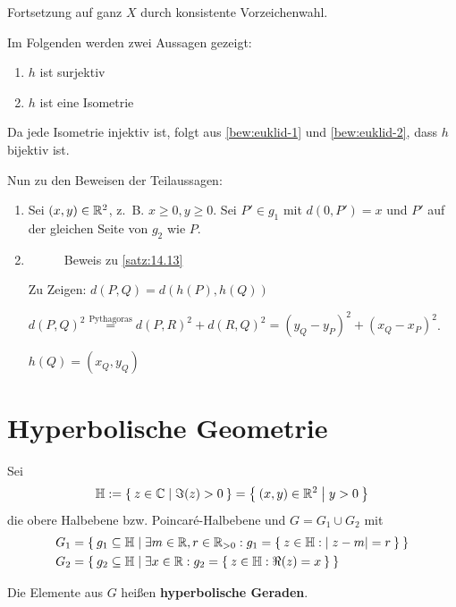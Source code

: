 \begin{beweis}
\begin{enumerate}[label=(\roman*)]
              Fortsetzung auf ganz $X$ durch konsistente Vorzeichenwahl.

			Im Folgenden werden zwei Aussagen gezeigt:
			\begin{enumerate}[label=(\roman*)]
				\item \label{bew:euklid-1} $h$ ist surjektiv
				\item \label{bew:euklid-2} $h$ ist eine Isometrie
			\end{enumerate}

			Da jede Isometrie injektiv ist, folgt aus \ref{bew:euklid-1}
			und \ref{bew:euklid-2}, dass $h$ bijektiv ist.

			Nun zu den Beweisen der Teilaussagen:

		 	\begin{enumerate}[label=(\roman*)]
				\item Sei $(x, y) \in \mathbb{R}^2$, z.~B. $x \geq 0, y \geq 0$.
                Sei $P' \in g_1$ mit $d(0, P') = x$ und
                $P'$ auf der gleichen Seite von $g_2$ wie $P$.
				\item \begin{figure}[htp]
                    \centering
                    
                    \caption{Beweis zu \cref{satz:14.13}}
                    \label{fig:14.13.0.1}
                \end{figure}
                Zu Zeigen: $d(P, Q) = d(h(P), h(Q))$

                $d(P, Q)^2 \overset{\text{Pythagoras}}{=} d(P, R)^2 + d(R, Q)^2 = (y_Q - y_P)^2 + (x_Q - x_P)^2$.

                $h(Q) = (x_Q, y_Q)$
			\end{enumerate}
    \end{enumerate}
\end{beweis}
\section{Hyperbolische Geometrie}
\begin{definition}%
    Sei
        \[\mathbb{H}:= \Set{z \in \ensuremath{\mathbb{C}}| \Im(z) > 0} = \Set{(x,y) \in \ensuremath{\mathbb{R}}^2 | y > 0}\]
    die obere Halbebene bzw. Poincaré-Halbebene und $G = G_1 \cup G_2$
    mit
        \begin{align*}
            G_1 &= \Set{g_1 \subseteq \ensuremath{\mathbb{H}}| \exists m \in \ensuremath{\mathbb{R}}, r \in \ensuremath{\mathbb{R}}_{>0}: g_1 = \Set{z \in \ensuremath{\mathbb{H}}: |z-m|=r}}\\
            G_2 &= \Set{g_2 \subseteq \ensuremath{\mathbb{H}}| \exists x \in \ensuremath{\mathbb{R}}: g_2 = \Set{z \in \ensuremath{\mathbb{H}}: \Re(z) = x}}
        \end{align*}

    Die Elemente aus $G$ heißen \textbf{hyperbolische Geraden}.
\end{definition}

